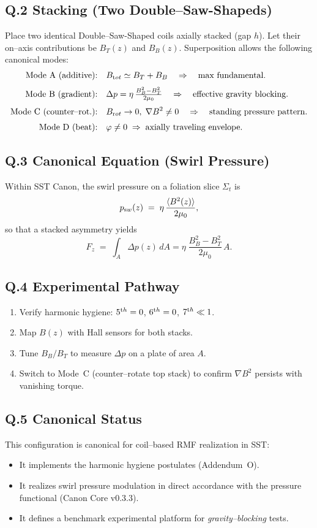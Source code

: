 \documentclass[reprint,aps,onecolumn,nofootinbib]{revtex4-2}
\begin{document}
\subsection*{Q.2 Stacking (Two Double--Saw-Shapeds)}
Place two identical Double--Saw-Shaped coils axially stacked (gap $h$).
Let their on--axis contributions be $B_T(z)$ and $B_B(z)$.
Superposition allows the following canonical modes:
\begin{align*}
	\text{Mode A (additive):}&\quad B_{\textrm tot}\simeq B_T+B_B
	\quad\Rightarrow\quad \text{max fundamental}.\\[3pt]
	\text{Mode B (gradient):}&\quad \Delta p = \eta\,\tfrac{B_B^2-B_T^2}{2\mu_0}
	\quad\Rightarrow\quad \text{effective gravity blocking}.\\[3pt]
	\text{Mode C (counter--rot.):}&\quad B_{\textrm rot}\to 0,\;
	\nabla B^2\neq 0
	\quad\Rightarrow\quad \text{standing pressure pattern}.\\[3pt]
	\text{Mode D (beat):}&\quad \varphi\neq 0\;\Rightarrow\;\text{axially traveling envelope}.
\end{align*}

\subsection*{Q.3 Canonical Equation (Swirl Pressure)}
Within SST Canon, the swirl pressure on a foliation slice $\Sigma_t$ is
\[
	p_{\textrm sw}(z) \;=\; \eta\,\frac{\langle B^2(z)\rangle}{2\mu_0},
\]
so that a stacked asymmetry yields
\[
	F_z \;=\; \int_A \Delta p(z)\,dA
	=\eta\;\frac{B_B^2-B_T^2}{2\mu_0}\,A.
\]

\subsection*{Q.4 Experimental Pathway}
\begin{enumerate}
	\item Verify harmonic hygiene: $5^{\textrm th}=0$, $6^{\textrm th}=0$, $7^{\textrm th}\ll1$.
	\item Map $B(z)$ with Hall sensors for both stacks.
	\item Tune $B_B/B_T$ to measure $\Delta p$ on a plate of area $A$.
	\item Switch to Mode~C (counter--rotate top stack) to confirm $\nabla B^2$ persists with vanishing torque.
\end{enumerate}

\subsection*{Q.5 Canonical Status}
This configuration is canonical for coil--based RMF realization in SST:
\begin{itemize}
	\item It implements the harmonic hygiene postulates (Addendum~O).
	\item It realizes swirl pressure modulation in direct accordance with the pressure functional (Canon Core v0.3.3).
	\item It defines a benchmark experimental platform for \emph{gravity--blocking} tests.
\end{itemize}
\end{document}
